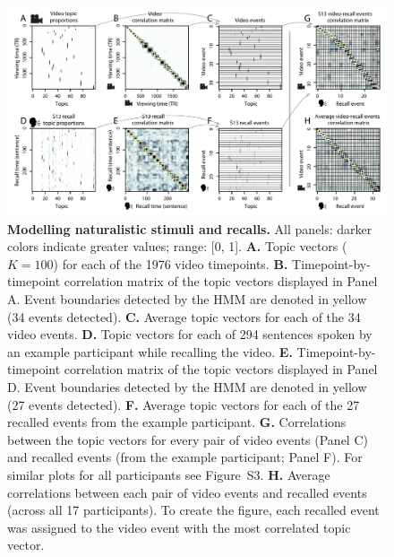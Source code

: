 \documentclass{article}
\newcommand{\matchmats}{S3}
\begin{document}
\begin{figure}[tp]
\centering
\includegraphics[width=\textwidth]{figs/eventseg}
\caption{\small \textbf{Modelling naturalistic stimuli and recalls.} All panels: darker colors indicate greater values; range: [0, 1].  \textbf{A.} Topic vectors ($K = 100$) for each of the 1976 video timepoints.  \textbf{B.} Timepoint-by-timepoint correlation matrix of the topic vectors displayed in Panel A.  Event boundaries detected by the HMM are denoted in yellow (34 events detected).  \textbf{C.} Average topic vectors for each of the 34 video events. \textbf{D.} Topic vectors for each of 294 sentences spoken by an example participant while recalling the video.  \textbf{E.} Timepoint-by-timepoint correlation matrix of the topic vectors displayed in Panel D. Event boundaries detected by the HMM are denoted in yellow (27 events detected).  \textbf{F.} Average topic vectors for each of the 27 recalled events from the example participant.  \textbf{G.} Correlations between the topic vectors for every pair of video events (Panel C) and recalled events (from the example participant; Panel F).  For similar plots for all participants see Figure~\matchmats.  \textbf{H.} Average correlations between each pair of video events and recalled events (across all 17 participants).  To create the figure, each recalled event was assigned to the video event with the most correlated topic vector.}
\label{fig:model}
\end{figure}
\end{document}
